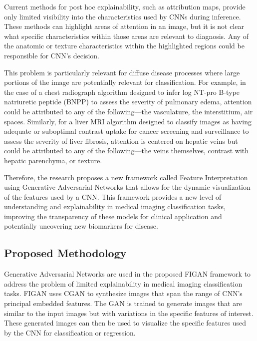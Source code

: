\noindent
Current methods for post hoc explainability, such as attribution maps, provide only limited visibility into the characteristics used by CNNs during inference. These methods can highlight areas of attention in an image, but it is not clear what specific characteristics within those areas are relevant to diagnosis. Any of the anatomic or texture characteristics within the highlighted regions could be responsible for CNN's decision. 

\noindent
This problem is particularly relevant for diffuse disease processes where large portions of the image are potentially relevant for classification. For example, in the case of a chest radiograph algorithm designed to infer log NT-pro B-type natriuretic peptide (BNPP) to assess the severity of pulmonary edema, attention could be attributed to any of the following—the vasculature, the interstitium, air spaces. Similarly, for a liver MRI algorithm designed to classify images as having adequate or suboptimal contrast uptake for cancer screening and surveillance to assess the severity of liver fibrosis, attention is centered on hepatic veins but could be attributed to any of the following—the veins themselves, contrast with hepatic parenchyma, or texture. 

\noindent
Therefore, the research proposes a new framework called Feature Interpretation using Generative Adversarial Networks that allows for the dynamic visualization of the features used by a CNN. This framework provides a new level of understanding and explainability in medical imaging classification tasks, improving the transparency of these models for clinical application and potentially uncovering new biomarkers for disease.

\clearpage

\subsection{Proposed Methodology}

\noindent
Generative Adversarial Networks are used in the proposed FIGAN framework to address the problem of limited explainability in medical imaging classification tasks. FIGAN uses CGAN to synthesize images that span the range of CNN's principal embedded features. The GAN is trained to generate images that are similar to the input images but with variations in the specific features of interest. These generated images can then be used to visualize the specific features used by the CNN for classification or regression. 

